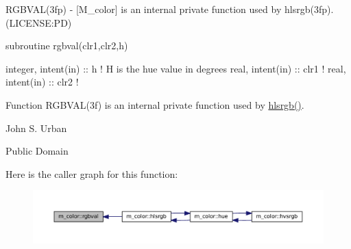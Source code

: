 \begin{DoxyDescription}
\item[\label{_RGBVAL}%
N\+A\+ME ]R\+G\+B\+V\+A\+L(3fp) -\/ \mbox{[}M\+\_\+color\mbox{]} is an internal private function used by hlsrgb(3fp). (L\+I\+C\+E\+N\+SE\+:PD) 


\item[S\+Y\+N\+O\+P\+S\+IS]
\begin{DoxyPre}
    subroutine rgbval(clr1,clr2,h)\end{DoxyPre}



\begin{DoxyPre}     integer, intent(in) :: h ! H is the hue value in degrees
     real, intent(in) :: clr1 !
     real, intent(in) :: clr2 !
    \end{DoxyPre}
 


\item[D\+E\+S\+C\+R\+I\+P\+T\+I\+ON ]Function R\+G\+B\+V\+A\+L(3f) is an internal private function used by \mbox{\hyperlink{namespacem__color_a40e6c91da216384eded2157cdaf86eba}{hlsrgb()}}.




\item[A\+U\+T\+H\+OR ]

John S. Urban




\item[L\+I\+C\+E\+N\+SE ]

Public Domain




\end{DoxyDescription}Here is the caller graph for this function\+:\nopagebreak
\begin{figure}[H]
\begin{center}
\leavevmode
\includegraphics[width=350pt]{namespacem__color_a3e97e24dba7b820f685f13eaa64a6caa_icgraph}
\end{center}
\end{figure}
\mbox{\label{namespacem__color_a386d004a1392b7e01ff66f1676d43def}} 
